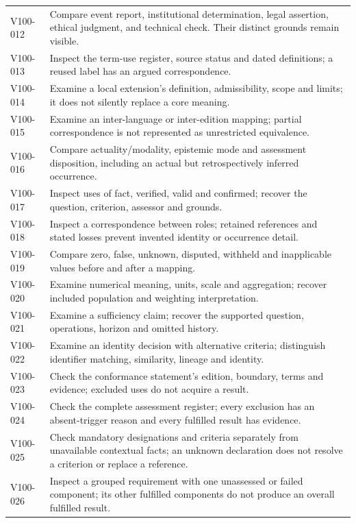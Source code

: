 \documentclass[11pt,a4paper]{article}
\begin{document}
\begin{longtable}{@{}L{0.17\textwidth}L{0.73\textwidth}@{}}
V100-012 & Compare event report, institutional determination, legal assertion, ethical judgment, and technical check. Their distinct grounds remain visible. \\
V100-013 & Inspect the term-use register, source status and dated definitions; a reused label has an argued correspondence. \\
V100-014 & Examine a local extension's definition, admissibility, scope and limits; it does not silently replace a core meaning. \\
V100-015 & Examine an inter-language or inter-edition mapping; partial correspondence is not represented as unrestricted equivalence. \\
V100-016 & Compare actuality/modality, epistemic mode and assessment disposition, including an actual but retrospectively inferred occurrence. \\
V100-017 & Inspect uses of fact, verified, valid and confirmed; recover the question, criterion, assessor and grounds. \\
V100-018 & Inspect a correspondence between roles; retained references and stated losses prevent invented identity or occurrence detail. \\
V100-019 & Compare zero, false, unknown, disputed, withheld and inapplicable values before and after a mapping. \\
V100-020 & Examine numerical meaning, units, scale and aggregation; recover included population and weighting interpretation. \\
V100-021 & Examine a sufficiency claim; recover the supported question, operations, horizon and omitted history. \\
V100-022 & Examine an identity decision with alternative criteria; distinguish identifier matching, similarity, lineage and identity. \\
V100-023 & Check the conformance statement's edition, boundary, terms and evidence; excluded uses do not acquire a result. \\
V100-024 & Check the complete assessment register; every exclusion has an absent-trigger reason and every fulfilled result has evidence. \\
V100-025 & Check mandatory designations and criteria separately from unavailable contextual facts; an unknown declaration does not resolve a criterion or replace a reference. \\
V100-026 & Inspect a grouped requirement with one unassessed or failed component; its other fulfilled components do not produce an overall fulfilled result. \\
\bottomrule
\end{longtable}
\end{document}
